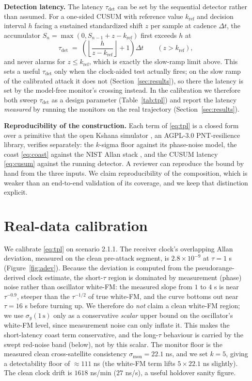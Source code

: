 \documentclass[conference]{IEEEtran}
\begin{document}
\textbf{Detection latency.} The latency $\tau_{\mathrm{det}}$ can be set by the
sequential detector rather than assumed. For a one-sided CUSUM with reference value
$k_{\mathrm{ref}}$ and decision interval $h$ facing a sustained standardized shift
$z$ per sample at cadence $\Delta t$, the accumulator
$S_n=\max(0,S_{n-1}+z-k_{\mathrm{ref}})$ first exceeds $h$ at
\begin{equation}
\tau_{\mathrm{det}} \;=\; \left(\left\lfloor \frac{h}{z-k_{\mathrm{ref}}} \right\rfloor + 1\right)\Delta t
\qquad (z>k_{\mathrm{ref}}),
\label{eq:cusum}
\end{equation}
and never alarms for $z\le k_{\mathrm{ref}}$, which is exactly the slow-ramp limit
above. This sets a useful $\tau_{\mathrm{det}}$ only when the clock-aided test
actually fires; on the slow ramp of the calibrated attack it does not
(Section~\ref{sec:results}), so there the latency is set by the model-free monitor's
crossing instead. In the calibration we therefore both sweep $\tau_{\mathrm{det}}$
as a design parameter (Table~\ref{tab:tpl}) and report the latency \emph{measured} by
running the monitors on the real trajectory (Section~\ref{sec:results}).

\textbf{Reproducibility of the construction.} Each term of \eqref{eq:tpl} is a
closed form over a primitive that the open Kshana simulator \cite{kshana}, an
AGPL-3.0 PNT-resilience library, verifies separately: the $k$-sigma floor against
its phase-noise model, the coast \eqref{eq:coast} against the NIST Allan stack
\cite{riley}, and the CUSUM latency \eqref{eq:cusum} against the running detector. A
reviewer can reproduce the bound by hand from the three inputs. We claim
reproducibility of the composition, which is weaker than an end-to-end validation of
its coverage, and we keep that distinction explicit.

\section{Real-data calibration}
\label{sec:calib}
We calibrate \eqref{eq:tpl} on scenario 2.1.1. The receiver clock's overlapping
Allan deviation, measured on the clean pre-attack segment, is $2.8\times10^{-9}$ at
$\tau=1$ s (Figure~\ref{fig:adev}). Because the deviation is computed from the
pseudorange-derived clock estimate, the short-$\tau$ region is dominated by
measurement (phase) noise rather than oscillator white-FM: the measured slope from
$1$ to $4$ s is near $\tau^{-0.9}$, steeper than the $\tau^{-1/2}$ of true white-FM,
and the curve bottoms out near $\tau=16$ s before turning up. We therefore do
\emph{not} claim a clean white-FM region; we use $\sigma_y(1\,\mathrm{s})$ only as a
conservative \emph{scalar} upper bound on the oscillator's white-FM level, since
measurement noise can only inflate it. This makes the short-latency coast term
conservative, and the long-$\tau$ behaviour is carried by the swept red-noise band
(below), not by this scalar. The monitor floor is the measured clean cross-satellite
consistency $\sigma_{\mathrm{mon}}=22.1$ ns, and we set $k=5$, giving a detectability
floor of $\approx$$111$ ns (the white-FM term lifts $5\times22.1$ ns slightly). The
clean clock drift is $1618$ ns/min ($27$ ns/s), a useful holdover sanity figure.
\end{document}

